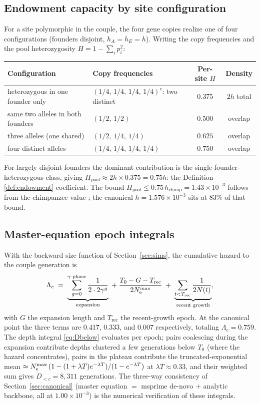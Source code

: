 \subsection{Endowment capacity by site configuration}\label{app:capacity}
For a site polymorphic in the couple, the four gene copies realize one of
four configurations (founders disjoint, $h_A = h_E = h$). Writing the
copy frequencies and the pool heterozygosity
$H = 1 - \sum_i p_i^2$:

\begin{center}\small
\begin{tabular}{llcc}
\toprule
Configuration & Copy frequencies & Per-site $H$ & Density \\
\midrule
heterozygous in one founder only & $(1/4,\,1/4,\,1/4,\,1/4)^{c}$: two distinct & $0.375$ & $2h$ total \\
same two alleles in both founders & $(1/2,\,1/2)$ & $0.500$ & overlap \\
three alleles (one shared) & $(1/2,\,1/4,\,1/4)$ & $0.625$ & overlap \\
four distinct alleles & $(1/4,\,1/4,\,1/4,\,1/4)$ & $0.750$ & overlap \\
\bottomrule
\end{tabular}
\end{center}

For largely disjoint founders the dominant contribution is the
single-founder-heterozygous class, giving
$H_{\mathrm{pool}} \approx 2h \times 0.375 = 0.75h$: the Definition
\ref{def:endowment} coefficient. The bound
$H_{\mathrm{pool}} \le 0.75\,h_{\mathrm{chimp}} = 1.43\times10^{-3}$
follows from the chimpanzee value
\citep{PradoMartinez2013}; the canonical $h = 1.576\times10^{-3}$ sits at
$83\%$ of that bound.

\subsection{Master-equation epoch integrals}\label{app:integrals}
With the backward size function of Section~\ref{sec:sims}, the cumulative
hazard to the couple generation is
\begin{equation}\label{eq:appLam}
\Lambda_c \;=\; \underbrace{\sum_{g=0}^{\gamma\text{-phase}}\frac{1}{2\cdot 2\gamma^{g}}}_{\text{expansion}}
\;+\; \frac{T_0 - G - T_{\mathrm{rec}}}{2N_{\mathrm{e}}^{\max}}
\;+\; \underbrace{\sum_{t<T_{\mathrm{rec}}}\frac{1}{2N(t)}}_{\text{recent growth}} ,
\end{equation}
with $G$ the expansion length and $T_{\mathrm{rec}}$ the recent-growth
epoch. At the canonical point the three terms are $0.417$, $0.333$, and
$0.007$ respectively, totaling $\Lambda_c = 0.759$. The depth integral
\eqref{eq:Dbelow} evaluates per epoch; pairs coalescing during the
expansion contribute depths clustered a few generations below $T_0$
(where the hazard concentrates), pairs in the plateau contribute the
truncated-exponential mean $\approx N_{\mathrm{e}}^{\max}\,(1-(1+\lambda
T)e^{-\lambda T})/(1-e^{-\lambda T})$ at $\lambda T \approx 0.33$,
and their weighted sum gives $D_{<c} = 8{,}311$ generations. The
three-way consistency of Section~\ref{sec:canonical} (master equation
$= $ msprime de-novo $+$ analytic backbone, all at $1.00\times10^{-3}$)
is the numerical verification of these integrals.

